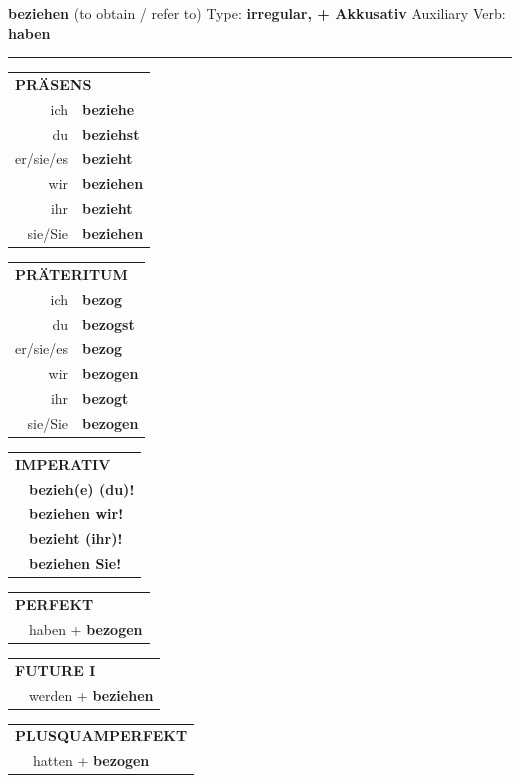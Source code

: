 \documentclass[10pt,a4paper]{revtex4-2}
\begin{document}
\begin{verbbox-acc}
{\Large \bf beziehen} (to obtain / refer to) \hfill Type: \textbf{irregular, + Akkusativ} \hfill Auxiliary Verb: \textbf{haben}

\vspace{5pt}
\hrule
\vspace{5pt}

\begin{tabular}{rl}
\multicolumn{2}{l}{\textbf{PRÄSENS}}\\
ich & \textbf{beziehe}\\
du & \textbf{beziehst}\\
er/sie/es & \textbf{bezieht}\\
wir & \textbf{beziehen}\\
ihr & \textbf{bezieht}\\
sie/Sie & \textbf{beziehen}\\
\end{tabular}
\hfill
\begin{tabular}{rl}
\multicolumn{2}{l}{\textbf{PRÄTERITUM}}\\
ich & \textbf{bezog}\\
du & \textbf{bezogst}\\
er/sie/es & \textbf{bezog}\\
wir & \textbf{bezogen}\\
ihr & \textbf{bezogt}\\
sie/Sie & \textbf{bezogen}\\
\end{tabular}
\hfill
\begin{tabular}{rl}
\multicolumn{2}{l}{\textbf{IMPERATIV}}\\
& \textbf{bezieh(e) (du)!}\\
& \textbf{beziehen wir!}\\
& \textbf{bezieht (ihr)!}\\
& \textbf{beziehen Sie!}\\
\end{tabular}

\vspace{10pt}

\begin{tabular}{rl}
\multicolumn{2}{l}{\textbf{PERFEKT}}\\
& haben + \textbf{bezogen}\\
\end{tabular}
\hfill
\begin{tabular}{rl}
\multicolumn{2}{l}{\textbf{FUTURE I}}\\
& werden + \textbf{beziehen}\\
\end{tabular}
\hfill
\begin{tabular}{rl}
\multicolumn{2}{l}{\textbf{PLUSQUAMPERFEKT}}\\
& hatten + \textbf{bezogen}\\
\end{tabular}


\end{verbbox-acc}
\end{document}
